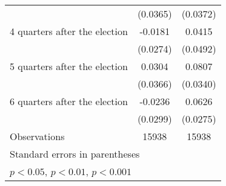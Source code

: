 \begin{table}[htbp]
\begin{tabular}{l*{2}{c}}
                    &    (0.0365)         &    (0.0372)         \\
[1em]
 4 quarters after the election&     -0.0181         &      0.0415         \\
                    &    (0.0274)         &    (0.0492)         \\
[1em]
 5 quarters after the election&      0.0304         &      0.0807\sym{*}  \\
                    &    (0.0366)         &    (0.0340)         \\
[1em]
 6 quarters after the election&     -0.0236         &      0.0626\sym{*}  \\
                    &    (0.0299)         &    (0.0275)         \\
\hline
Observations        &       15938         &       15938         \\
\hline\hline
\multicolumn{3}{l}{\footnotesize Standard errors in parentheses}\\
\multicolumn{3}{l}{\footnotesize \sym{*} \(p<0.05\), \sym{**} \(p<0.01\), \sym{***} \(p<0.001\)}\\
\end{tabular}
\end{table}
